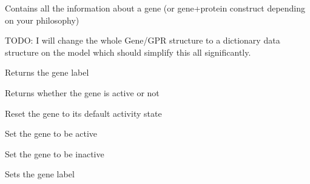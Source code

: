 \documentclass[a4paper,11pt,english]{sphinxmanual}
\begin{document}

\begin{fulllineitems}
\label{modules_doc:cbmpy.CBModel.Gene}
Contains all the information about a gene (or gene+protein construct depending on your philosophy)

TODO: I will change the whole Gene/GPR structure to a dictionary data structure on the model which should simplify this all significantly.

\begin{fulllineitems}
\label{modules_doc:cbmpy.CBModel.Gene.getLabel}
Returns the gene label

\end{fulllineitems}


\begin{fulllineitems}
\label{modules_doc:cbmpy.CBModel.Gene.isActive}
Returns whether the gene is active or not

\end{fulllineitems}


\begin{fulllineitems}
\label{modules_doc:cbmpy.CBModel.Gene.resetActivity}
Reset the gene to its default activity state

\end{fulllineitems}


\begin{fulllineitems}
\label{modules_doc:cbmpy.CBModel.Gene.setActive}
Set the gene to be active

\end{fulllineitems}


\begin{fulllineitems}
\label{modules_doc:cbmpy.CBModel.Gene.setInactive}
Set the gene to be inactive

\end{fulllineitems}


\begin{fulllineitems}
\label{modules_doc:cbmpy.CBModel.Gene.setLabel}
Sets the gene label

\end{fulllineitems}


\end{fulllineitems}
\end{document}
